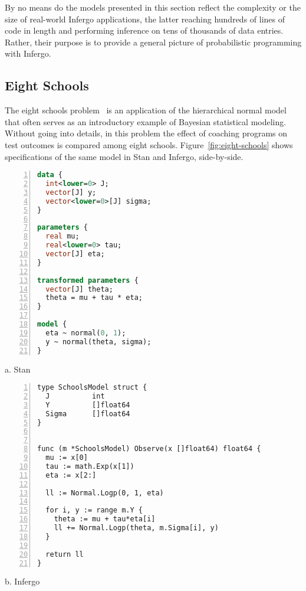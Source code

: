 \documentclass[sigplan,review,10pt,anonymous]{acmart}
\begin{document}
\begin{sloppypar}
By no means do the models presented in this section reflect the
complexity or the size of real-world Infergo applications, the
latter reaching hundreds of lines of code in length and
performing inference on tens of thousands of data entries.
Rather, their purpose is to provide a general picture of
probabilistic programming with Infergo.

\subsection{Eight Schools}
\label{sec:eight-schools}

The eight schools problem~\cite{GCS+03} is an application of
the hierarchical normal model that often serves as an introductory
example of Bayesian statistical modeling. Without going into
details, in this problem the effect of coaching programs on test
outcomes is compared among eight schools.
Figure~\ref{fig:eight-schools} shows specifications of the same
model in Stan and Infergo, side-by-side.
\begin{figure*}
\begin{minipage}[t]{0.45\textwidth}
  \begin{lstlisting}[language=Stan,framexleftmargin=10pt,numbers=left]
data {
  int<lower=0> J;
  vector[J] y;
  vector<lower=0>[J] sigma;
}

parameters {
  real mu;
  real<lower=0> tau;
  vector[J] eta;
}

transformed parameters {
  vector[J] theta;
  theta = mu + tau * eta;
}

model {
  eta ~ normal(0, 1);
  y ~ normal(theta, sigma);
}
\end{lstlisting}

\centering
a. Stan
  \end{minipage}
  \hfill
\begin{minipage}[t]{0.5\textwidth}
\begin{lstlisting}[framexleftmargin=10pt,numbers=left]
type SchoolsModel struct {
  J          int
  Y          []float64
  Sigma      []float64
}


func (m *SchoolsModel) Observe(x []float64) float64 {
  mu := x[0]
  tau := math.Exp(x[1])
  eta := x[2:]

  ll := Normal.Logp(0, 1, eta)

  for i, y := range m.Y {
    theta := mu + tau*eta[i]
    ll += Normal.Logp(theta, m.Sigma[i], y)
  }

  return ll
}
\end{lstlisting}
\centering
b. Infergo
  \end{minipage}
  \caption{Eight schools: Stan vs. Infergo. The Go implementation
  has a similar length and structure to the Stan model.}
  \label{fig:eight-schools}
\end{figure*}


\end{sloppypar}
\end{document}
